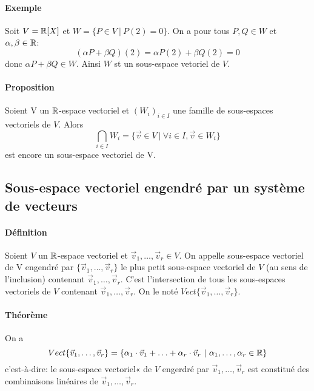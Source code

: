 \paragraph{Exemple} Soit $V=\mathbb{R}[X]$ et $W=\{ P \in V ~ | ~ P(2)=0\}$.
On a pour tous $P, Q \in W$ et $\alpha, \beta \in \mathbb{R}$: $$(\alpha P + \beta Q)(2)=\alpha P(2) + \beta Q(2)=0$$ donc $\alpha P + \beta Q \in W$. Ainsi $W$ st un sous-espace vetoriel de $V$.

\paragraph{Proposition} Soient V un $\mathbb{R}$-espace vectoriel et $(W_i)_{i \in I}$ une famille de sous-espaces vectoriels de $V$. Alors 
$$\bigcap_{i \in I} W_i = \{ \vec{v} \in V ~ \vert ~ \forall i \in I, \vec{v} \in W_i\}$$
est encore un sous-espace vectoriel de V.

%
\subsection{Sous-espace vectoriel engendré par un système de vecteurs}
%
\paragraph{Définition} Soient $V$ un $\mathbb{R}$-espace vectoriel et $\vec{v}_1, \ldots, \vec{v}_r \in V$. On appelle sous-espace vectoriel de V engendré par $\{\vec{v}_1, \ldots, \vec{v}_r\}$ le plus petit sous-espace vectoriel de $V$ (au sens de l'inclusion) contenant $\vec{v}_1, \ldots, \vec{v}_r$. C'est l'intersection de tous les sous-espaces vectoriels de $V$ contenant $\vec{v}_1, \ldots, \vec{v}_r$. On le noté $Vect\{\vec{v}_1, \ldots, \vec{v}_r\}$.

\paragraph{Théorème} On a 
$$Vect\{\vec{v}_1, \ldots, \vec{v}_r\} = \{\alpha_1 \cdot \vec{v}_1 + \ldots + \alpha_r \cdot \vec{v}_r ~ | ~ \alpha_1, \ldots, \alpha_r \in \mathbb{R} \}$$
c'est-à-dire: le sous-espace vectoriel« de $V$ engerdré par $\vec{v}_1, \ldots, \vec{v}_r$ est constitué des combinaisons linéaires de $\vec{v}_1, \ldots, \vec{v}_r$.

